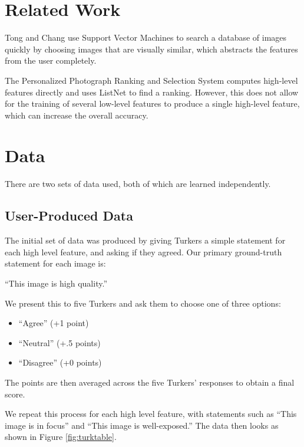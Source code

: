 \documentclass[11pt,letter]{article}
\begin{document}
\section{Related Work}
Tong and Chang\cite{Tong:2001:SVM:500141.500159} use Support Vector Machines to search a database of images quickly by choosing images that are visually similar, which abstracts the features from the user completely.

The Personalized Photograph Ranking and Selection System\cite{Yeh:2010:PPR:1873951.1873963} computes high-level features directly and uses ListNet\cite{Cao:2007:LRP:1273496.1273513} to find a ranking. However, this does not allow for the training of several low-level features to produce a single high-level feature, which can increase the overall accuracy.

\section{Data}

There are two sets of data used, both of which are learned independently.

\subsection{User-Produced Data}
\label{turkdata}
The initial set of data was produced by giving Turkers a simple statement for each high level feature, and asking if they agreed. Our primary ground-truth statement for each image is:

``This image is high quality.''

We present this to five Turkers and ask them to choose one of three options:

\begin{itemize}
\item ``Agree'' (+1 point)
\item ``Neutral'' (+.5 points)
\item ``Disagree'' (+0 points)
\end{itemize}
The points are then averaged across the five Turkers' responses to obtain a final score.

We repeat this process for each high level feature, with statements such as ``This image is in focus'' and ``This image is well-exposed.'' The data then looks as shown in Figure \ref{fig:turktable}.
\end{document}
